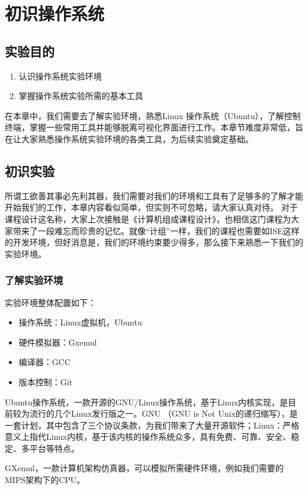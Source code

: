 ﻿\chapter{初识操作系统}

\section{实验目的}
  \begin{enumerate}
    \item 认识操作系统实验环境
    \item 掌握操作系统实验所需的基本工具
  \end{enumerate}
  
在本章中，我们需要去了解实验环境，熟悉Linux 操作系统（Ubuntu），了解控制终端，掌握一些常用工具并能够脱离可视化界面进行工作。本章节难度非常低，旨在让大家熟悉操作系统实验环境的各类工具，为后续实验奠定基础。

\section{初识实验}
所谓工欲善其事必先利其器，我们需要对我们的环境和工具有了足够多的了解才能开始我们的工作，本章内容看似简单，但实则不可忽略，请大家认真对待。
对于课程设计这名称，大家上次接触是《计算机组成课程设计》，也相信这门课程为大家带来了一段难忘而珍贵的记忆。就像“计组”一样，我们的课程也需要如ISE这样的开发环境，但好消息是，我们的环境约束要少得多，那么接下来熟悉一下我们的实验环境。

\subsection{了解实验环境}
实验环境整体配置如下：
\begin{itemize}
    \item 操作系统：Linux虚拟机，Ubuntu
    \item 硬件模拟器：Gxemul
    \item 编译器：GCC
    \item 版本控制：Git
 \end{itemize}
	
Ubuntu操作系统，一款开源的GNU/Linux操作系统，基于Linux内核实现，是目前较为流行的几个Linux发行版之一。GNU （GNU is Not Unix的递归缩写），是一套计划，其中包含了三个协议条款，为我们带来了大量开源软件；Linux：严格意义上指代Linux内核，基于该内核的操作系统众多，具有免费、可靠、安全、稳定、多平台等特点。

GXemul，一款计算机架构仿真器，可以模拟所需硬件环境，例如我们需要的MIPS架构下的CPU。


